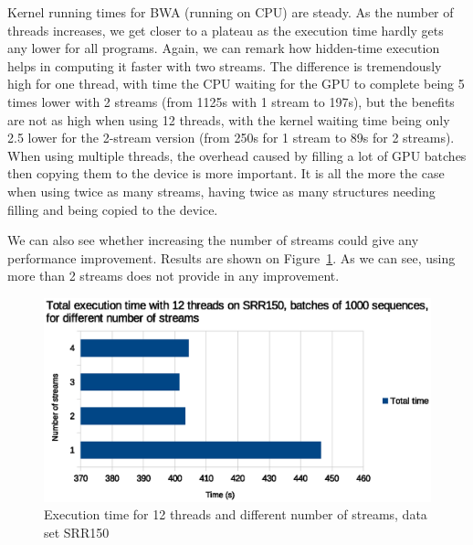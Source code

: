 Kernel running times for BWA (running on CPU) are steady. As the number of threads increases, we get closer to a plateau as the execution time hardly gets any lower for all programs. Again, we can remark how hidden-time execution helps in computing it faster with two streams. The difference is tremendously high for one thread, with time the CPU waiting for the GPU to complete being 5 times lower with 2 streams (from 1125s with 1 stream to 197s), but the benefits are not as high when using 12 threads, with the kernel waiting time being only 2.5 lower for the 2-stream version (from 250s for 1 stream to 89s for 2 streams). When using multiple threads, the overhead caused by filling a lot of GPU batches then copying them to the device is more important. It is all the more the case when using twice as many streams, having twice as many structures needing filling and being copied to the device.

We can also see whether increasing the number of streams could give any performance improvement. Results are shown on Figure~\ref{fig:exec-time-nbstreams}. As we can see, using more than 2 streams does not provide in any improvement. 

\begin{figure}[h]
	\centering
	\includegraphics[width=0.9\linewidth]{exec-time-nbstreams}
	\caption{Execution time for 12 threads and different number of streams, data set SRR150}
	\label{fig:exec-time-nbstreams}
\end{figure}

